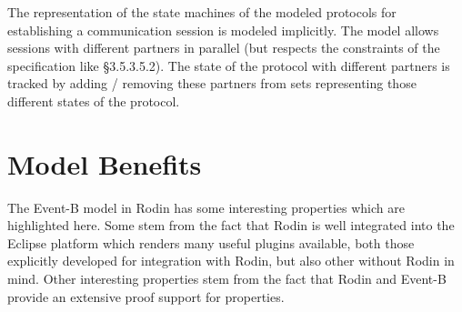 \documentclass{template/openetcs_article}
\begin{document}
The representation of the state machines of the modeled protocols for
establishing a communication session is modeled implicitly. The model allows
sessions with different partners in parallel (but respects the constraints of
the specification like §3.5.3.5.2). The state of the protocol with different
partners is tracked by adding / removing these partners from sets representing
those different states of the protocol.

\section{Model Benefits}
\label{sec:model-highlights}

The Event-B model in Rodin has some interesting properties which are highlighted
here. Some stem from the fact that Rodin is well integrated into the Eclipse
platform which renders many useful plugins available, both those explicitly
developed for integration with Rodin, but also other without Rodin in mind.
Other interesting properties stem from the fact that Rodin and Event-B provide
an extensive proof support for properties.
\end{document}
